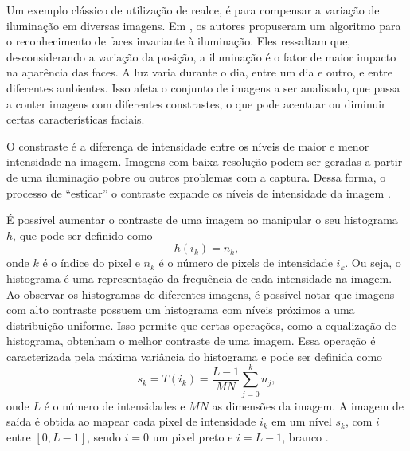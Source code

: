 Um exemplo clássico de utilização de realce, é para compensar a variação de iluminação em diversas imagens. Em , os autores propuseram um algoritmo para o reconhecimento de faces invariante à iluminação. Eles ressaltam que, desconsiderando a variação da posição, a iluminação é o fator de maior impacto na aparência das faces. A luz varia durante o dia, entre um dia e outro, e entre diferentes ambientes. Isso afeta o conjunto de imagens a ser analisado, que passa a conter imagens com diferentes constrastes, o que pode acentuar ou diminuir certas características faciais.

O constraste é a diferença de intensidade entre os níveis de maior e menor intensidade na imagem. Imagens com baixa resolução podem ser geradas a partir de uma iluminação pobre ou outros problemas com a captura. Dessa forma, o processo de ``esticar'' o contraste expande os níveis de intensidade da imagem \cite{Gonzalez2007}.

É possível aumentar o contraste de uma imagem ao manipular o seu histograma $h$, que pode ser definido como
\begin{equation*}
h(i_k) = n_k,
\end{equation*}
\noindent onde $k$ é o índice do pixel e $n_k$ é o número de pixels de intensidade $i_k$. Ou seja, o histograma é uma representação da frequência de cada intensidade na imagem. Ao observar os histogramas de diferentes imagens, é possível notar que imagens com alto contraste possuem um histograma com níveis próximos a uma distribuição uniforme. Isso permite que certas operações, como a equalização de histograma, obtenham o melhor contraste de uma imagem. Essa operação é caracterizada pela máxima variância do histograma e pode ser definida como
\begin{equation}
s_k = T(i_k) = \frac{L-1}{MN} \sum_{j=0}^{k}n_j,
\end{equation}
\noindent onde $L$ é o número de intensidades e $MN$ as dimensões da imagem. A imagem de saída é obtida ao mapear cada pixel de intensidade $i_k$ em um nível $s_k$, com $i$ entre $[0,L-1]$, sendo $i = 0$ um pixel preto e $i = L-1$, branco \cite{Gonzalez2007}.

